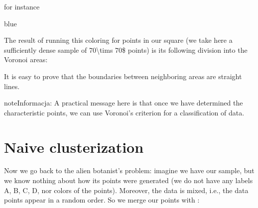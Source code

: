 \documentclass[a4paper,12pt,polish]{jupyterBook}
\begin{document}
\sphinxAtStartPar
for instance
\begin{sphinxVerbatimInput}

\begin{sphinxVerbatim}[commandchars=\\\{\}]
\PYG{p}{[}\PYG{p}{]}
\end{sphinxVerbatim}
\end{sphinxVerbatimInput}
\begin{sphinxVerbatimOutput}

\begin{sphinxVerbatim}[commandchars=\\\{\}]
\PYGZsq{}blue\PYGZsq{}
\end{sphinxVerbatim}
\end{sphinxVerbatimOutput}

\sphinxAtStartPar
The result of running this coloring for points in our square (we take here a sufficiently dense sample of 70\textbackslash{}tims 70\$ points) is its following division into the Voronoi areas:
\begin{sphinxVerbatimOutput}

\noindent{}
\end{sphinxVerbatimOutput}

\sphinxAtStartPar
It is easy to prove that the boundaries between neighboring areas are straight lines.

\begin{sphinxadmonition}{note}{Informacja:}
\sphinxAtStartPar
A practical message here is that once we have determined the characteristic points, we can use Voronoi’s criterion for a classification of data.
\end{sphinxadmonition}


\section{Naive clusterization}
\label{\detokenize{docs/unsupervised:naive-clusterization}}
\sphinxAtStartPar
Now we go back to the alien botanist’s problem:  imagine we have our sample, but we know nothing about how its points were generated (we do not have any labels A, B, C, D, nor colors of the points). Moreover, the data is mixed, i.e., the data points appear in a random order. So we merge our points with :
\begin{sphinxVerbatimInput}

\begin{sphinxVerbatim}[commandchars=\\\{\}]
   
\end{sphinxVerbatim}
\end{sphinxVerbatimInput}
\end{document}
